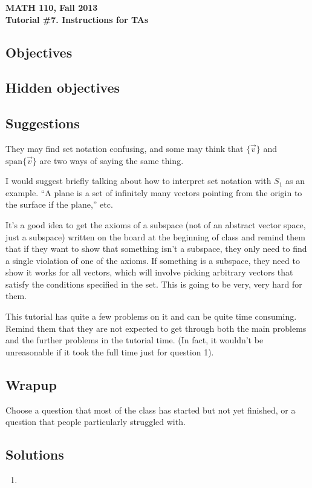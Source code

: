 \documentclass[11pt]{exam}
\newcommand{\mthCourse}{MATH 110}
\newcommand{\mthTerm}{Fall 2013}
\newcommand{\mthTutorialNumber}{7}
\begin{document}
\newpage
{\small
	\begin{center}
		{\bf \mthCourse, \mthTerm}\\ 
		{\bf Tutorial \#\mthTutorialNumber. Instructions for TAs}
	\end{center}
}

\subsection*{Objectives}


\subsection*{Hidden objectives}


\subsection*{Suggestions}
	They may find set notation confusing, and some may think that
	$\{\vec v\}$ and $\mathrm{span} \{\vec v\}$ are two ways of saying the same thing.

	I would suggest briefly talking about how to interpret set notation
	with $S_1$ as an example.  ``A plane is a set of infinitely many vectors
	pointing from the origin to the surface if the plane,'' etc.

	It's a good idea to get the axioms of a subspace (not of an abstract
	vector space, just a subspace) written on the board at the beginning of
	class and remind them that if they want to show that something
	isn't a subspace, they only need to find a single violation
	of one of the axioms.  If something is a subspace, they need to show it
	works for all vectors, which will involve picking arbitrary vectors
	that satisfy the conditions specified in the set.  This is going to be
	very, very hard for them.

	This tutorial has quite a few problems on it and can be quite time
	consuming.  Remind them that they are not expected to get through both
	the main problems and the further problems in the tutorial time. 
	(In fact, it wouldn't be unreasonable if it took the full time just
	for question 1).

\subsection*{Wrapup}
	Choose a question that most of the class has started but not yet finished,
	or a question that people particularly struggled with.

\subsection*{Solutions}
\begin{enumerate}
	\item
\end{enumerate}
	
\end{document}
